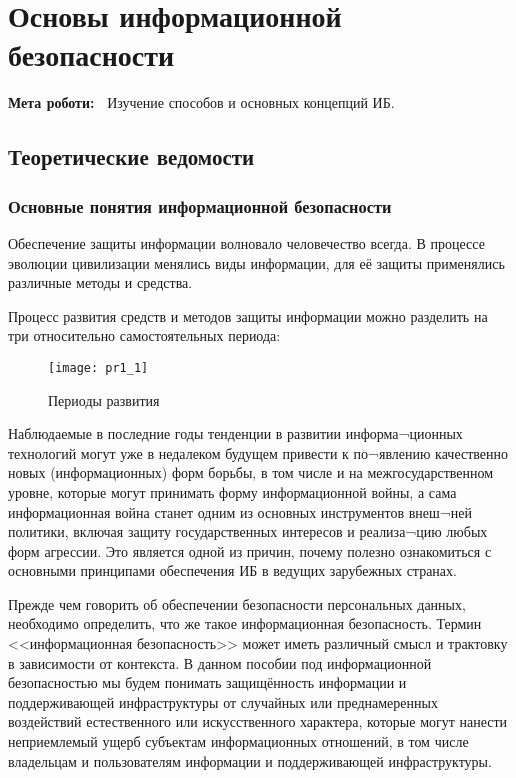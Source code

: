 \chapter{Основы информационной безопасности} \label{chapt1}%
\textbf{Мета роботи:~}%
Изучение способов и основных концепций ИБ.
\section{Теоретические ведомости} \label{sect1_a}
%
\subsection{Основные понятия информационной безопасности}

Обеспечение защиты информации волновало человечество всегда. В процессе
эволюции цивилизации менялись виды информации, для её защиты применялись
различные методы и средства.

Процесс развития средств и методов защиты информации можно разделить на три
относительно самостоятельных периода:
\begin{figure}[ht]
  \centering
  \texttt{[image: pr1\_1]}
  \caption{Периоды развития}\label{pr1_1}
\end{figure}

Наблюдаемые в последние годы тенденции в развитии информа¬ционных технологий
могут уже в недалеком будущем привести к по¬явлению качественно новых
(информационных) форм борьбы, в том числе и на межгосударственном уровне,
которые могут принимать форму информационной войны, а сама информационная
война станет одним из основных инструментов внеш¬ней политики, включая защиту
государственных интересов и реализа¬цию любых форм агрессии. Это является
одной из причин, почему полезно ознакомиться с основными принципами
обеспечения ИБ в ведущих зарубежных странах.

Прежде чем говорить об обеспечении безопасности персональных данных,
необходимо определить, что же такое информационная безопасность. Термин
<<информационная безопасность>> может иметь различный смысл и трактовку в
зависимости от контекста. В данном пособии под информационной безопасностью
мы будем понимать защищённость информации и поддерживающей инфраструктуры от
случайных или преднамеренных воздействий естественного или искусственного
характера, которые могут нанести неприемлемый ущерб субъектам информационных
отношений, в том числе владельцам и пользователям информации и поддерживающей
инфраструктуры.\href{https://www.intuit.ru/studies/courses/697/553/literature#literature.1}{\todo{[1]}}

